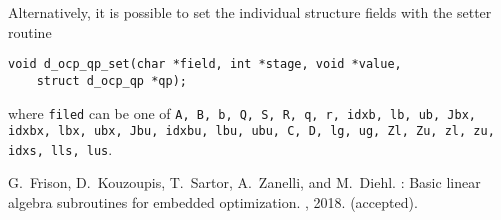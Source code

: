 \documentclass[a4paper]{report}
\begin{document}
Alternatively, it is possible to set the individual structure fields with the setter routine
\begin{verbatim}
void d_ocp_qp_set(char *field, int *stage, void *value,
    struct d_ocp_qp *qp);
\end{verbatim}
where {\tt filed} can be one of {\tt A, B, b, Q, S, R, q, r, idxb, lb, ub, Jbx, idxbx, lbx, ubx, Jbu, idxbu, lbu, ubu, C, D, lg, ug, Zl, Zu, zl, zu, idxs, lls, lus}.




%

\begin{thebibliography}{1}

G.~Frison, D.~Kouzoupis, T.~Sartor, A.~Zanelli, and M.~Diehl.
: Basic linear algebra subroutines for embedded
  optimization.
, 2018.
\newblock (accepted).

\end{thebibliography}
\end{document}
